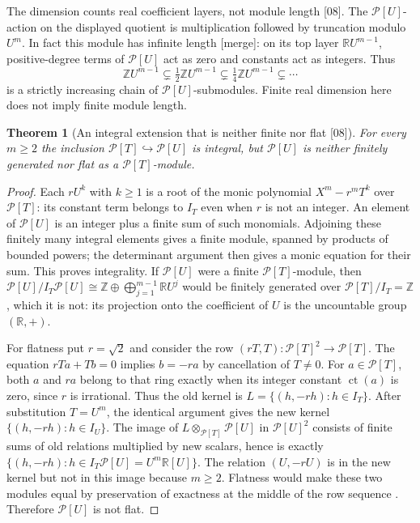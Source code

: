 \documentclass[11pt,oneside]{article}
\numberwithin{equation}{section}
\newtheorem{theorem}{Theorem}[section]
\theoremstyle{definition}
\theoremstyle{remark}
\newcommand{\Z}{\mathbb Z}
\newcommand{\R}{\mathbb R}
\newcommand{\ct}{\operatorname{ct}}
\newcommand{\src}[1]{\textup{\textsf{\small[#1]}}}
\newcommand{\mergetag}{\textup{\textsf{\small[merge]}}}
\newcommand{\Pmod}{\mathcal P}
\begin{document}
The dimension counts real coefficient layers, not module length \src{08}.
The $\Pmod[U]$-action on the displayed quotient is multiplication followed
by truncation modulo $U^m$. In fact this module has infinite length
\mergetag: on its top layer $\R U^{m-1}$, positive-degree terms of
$\Pmod[U]$ act as zero and constants act as integers. Thus
\[
 \Z U^{m-1}\subsetneq\tfrac12\Z U^{m-1}
 \subsetneq\tfrac14\Z U^{m-1}\subsetneq\cdots
\]
is a strictly increasing chain of $\Pmod[U]$-submodules. Finite real
dimension here does not imply finite module length.

\begin{theorem}[An integral extension that is neither finite nor flat \src{08}]\label{odg:frac:thm:nonflat}
For every $m\ge2$ the inclusion $\Pmod[T]\hookrightarrow\Pmod[U]$ is integral, but
$\Pmod[U]$ is neither finitely generated nor flat as a $\Pmod[T]$-module.
\end{theorem}
\begin{proof}
Each $rU^k$ with $k\ge1$ is a root of the monic polynomial
$X^m-r^mT^k$ over $\Pmod[T]$: its constant term belongs to $I_T$ even
when $r$ is not an integer. An element of $\Pmod[U]$ is an integer plus
a finite sum of such monomials. Adjoining these finitely many integral
elements gives a finite module, spanned by products of bounded powers;
the determinant argument then gives a monic equation for their sum.
This proves integrality. If $\Pmod[U]$ were a finite $\Pmod[T]$-module,
then
$\Pmod[U]/I_T\Pmod[U]\cong\Z\oplus\bigoplus_{j=1}^{m-1}\R U^j$ would be finitely
generated over $\Pmod[T]/I_T=\Z$, which it is not: its projection onto
the coefficient of $U$ is the uncountable group $(\R,+)$.

For flatness put $r=\sqrt2$ and consider the row
$(rT,T):\Pmod[T]^2\to\Pmod[T]$. The equation $rTa+Tb=0$ implies
$b=-ra$ by cancellation of $T\ne0$. For $a\in\Pmod[T]$, both $a$ and
$ra$ belong to that ring exactly when its integer constant $\ct(a)$ is
zero, since $r$ is irrational. Thus the old kernel is
$L=\{(h,-rh):h\in I_T\}$. After substitution $T=U^m$, the identical
argument gives the new kernel $\{(h,-rh):h\in I_U\}$.
The image of $L\otimes_{\Pmod[T]}\Pmod[U]$ in $\Pmod[U]^2$ consists of
finite sums of old relations multiplied by new scalars, hence is exactly
$\{(h,-rh):h\in I_T\Pmod[U]=U^m\R[U]\}$.
The relation $(U,-rU)$ is in the new kernel but not in this image because
$m\ge2$. Flatness would make these two modules equal by preservation of
exactness at the middle of the row sequence
\cite[Tag 00HK]{StacksFlat}. Therefore $\Pmod[U]$ is not flat.
\end{proof}
\end{document}
